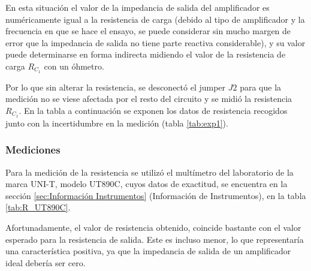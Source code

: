 
En esta situación el valor de la impedancia de salida del amplificador es numéricamente igual a la resistencia de carga (debido al tipo de amplificador y la frecuencia en que se hace el ensayo, se puede considerar sin mucho margen de error que la impedancia de salida no tiene parte reactiva considerable), y su valor puede determinarse en forma indirecta midiendo el valor de la resistencia de carga $R_{C_1}$ con un óhmetro. 

Por lo que sin alterar la resistencia, se desconectó el jumper $J2$ para que la medición no se viese afectada por el resto del circuito y se midió la resistencia $R_{C_1}$. En la tabla a continuación se exponen los datos de resistencia recogidos junto con la incertidumbre en la medición (tabla \ref{tab:exp1}).

\subsubsection{Mediciones}

Para la medición de la resistencia se utilizó el multímetro del laboratorio de la marca UNI-T, modelo UT890C, cuyos datos de exactitud, se encuentra en la sección \ref{sec:Información Instrumentos} (Información de Instrumentos), en la tabla \ref{tab:R_UT890C}.

\begin{table}[H]
    \centering
        \def\tablename{Tabla} 
        \caption{Valores esperados y obtenidos}
        \label{tab:exp1}
\end{table}

Afortunadamente, el valor de resistencia obtenido, coincide bastante con el valor esperado para la resistencia de salida. Este es incluso menor, lo que representaría una característica positiva, ya que la impedancia de salida de un amplificador ideal debería ser cero.
